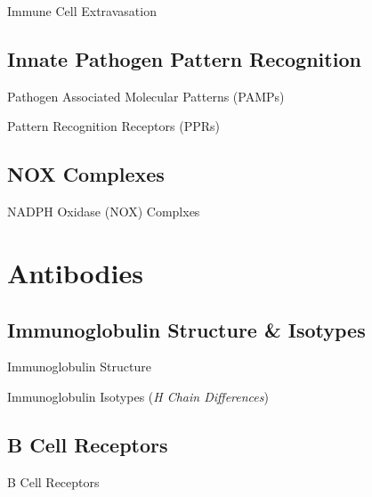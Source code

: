 \documentclass[10pt]{article}
\begin{document}
    \begin{core}{Immune Cell Extravasation}

    \end{core}

  \subsection{Innate Pathogen Pattern Recognition}

    \begin{core}{Pathogen Associated Molecular Patterns (PAMPs)}

    \end{core}

    \begin{core}{Pattern Recognition Receptors (PPRs)}

    \end{core}

  \subsection{NOX Complexes}

    \begin{core}{NADPH Oxidase (NOX) Complxes}

    \end{core}

\section{Antibodies}

  \subsection{Immunoglobulin Structure \& Isotypes}

    \begin{core}{Immunoglobulin Structure}

    \end{core}

    \begin{core}{Immunoglobulin Isotypes (\textit{H Chain Differences})}

    \end{core}

  \subsection{B Cell Receptors}

    \begin{core}{B Cell Receptors}

    \end{core}
\end{document}
